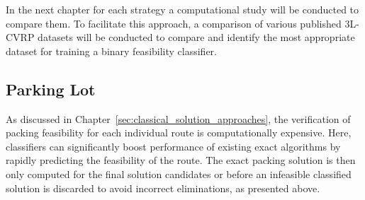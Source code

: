 \parbreak

In the next chapter for each strategy a computational study will be conducted to compare them. To facilitate this approach,
a comparison of various published \gls{3L-CVRP} datasets will be conducted to compare and identify the most appropriate
dataset for training a binary feasibility classifier.

\subsection*{Parking Lot}
As discussed in Chapter~\ref{sec:classical_solution_approaches}, the verification of
packing feasibility for each individual route is computationally expensive.
Here, classifiers can significantly boost performance of existing exact algorithms by rapidly predicting the feasibility of the route. The
exact packing solution is then only computed for the final solution candidates or before an infeasible classified solution
is discarded to avoid incorrect eliminations, as presented above.
